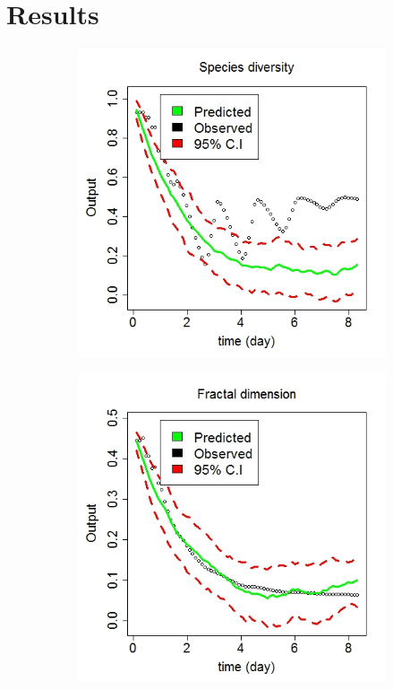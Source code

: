 \section{Results}
\begin{figure}[!ht] 
\begin{subfigure}[b]{.6\textwidth}
\includegraphics[width=1\textwidth]{p1d/p1d_1}
\end{subfigure}\hspace*{-.5em}
\centering
\begin{subfigure}[b]{.6\textwidth}
\includegraphics[width=1\textwidth]{p1d/p1d_3}

\end{subfigure}
\end{figure}
